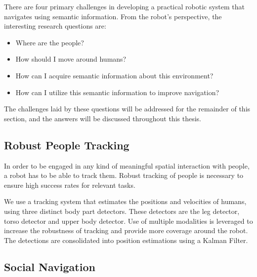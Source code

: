There are four primary challenges in developing a practical robotic system that navigates using semantic information. From the robot's perspective, the interesting research questions are:

\begin{itemize}
\item Where are the people?
\item How should I move around humans?
\item How can I acquire semantic information about this environment?
\item How can I utilize this semantic information to improve navigation?
\end{itemize}

The challenges laid by these questions will be addressed for the remainder of this section, and the answers will be discussed throughout this thesis.

\subsection{Robust People Tracking}

In order to be engaged in any kind of meaningful spatial interaction with people, a robot has to be able to track them. Robust tracking of people is necessary to ensure high success rates for relevant tasks.

We use a tracking system that estimates the positions and velocities of humans, using three distinct body part detectors. These detectors are the leg detector, torso detector and upper body detector. Use of multiple modalities is leveraged to increase the robustness of tracking and provide more coverage around the robot. The detections are consolidated into position estimations using a Kalman Filter.

\subsection{Social Navigation}

